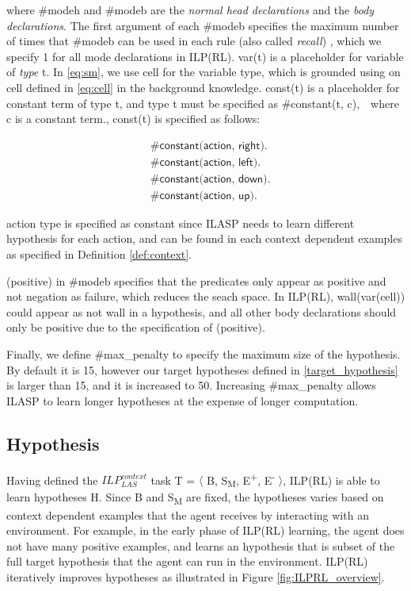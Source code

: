 where \textsf{\#modeh} and \textsf{\#modeb} are the \textit{normal head declarations} and the \textit{body declarations}. 
The first argument of each \textsf{\#modeb} specifies the maximum number of times that \textsf{\#modeb} can be used in each rule (also called \textit{recall}) \cite{Law2017}, 
which we specify 1 for all mode declarations in ILP(RL). \textsf{var(t)} is a placeholder for variable of \textit{type} \textsf{t}. In \ref{eq:sm}, we use \textsf{cell} for the variable type, which is grounded using on \textsf{cell} defined in \ref{eq:cell} in the background knowledge.
\textsf{const(t)} is a placeholder for constant term of type \textsf{t}, and type \textsf{t} must be specified as \textsf{\#constant(t, c)},　where \textsf{c} is a constant term., 
const(t) is specified as follows:

\begin{equation}
\begin{split}
&\textsf{\#constant(action, right).}\\
&\textsf{\#constant(action, left).}\\
&\textsf{\#constant(action, down).}\\
&\textsf{\#constant(action, up).}
\end{split}
\end{equation}

\textsf{action} type is specified as constant since ILASP needs to learn different hypothesis for each action, 
and can be found in each context dependent examples as specified in Definition \ref{def:context}.

\textsf{(positive)} in \textsf{\#modeb} specifies that the predicates only appear as positive and not negation as failure, which reduces the seach space. 
In ILP(RL), \textsf{wall(var(cell))} could appear as \textsf{not wall} in a hypothesis, and all other body declarations should only be positive due to the specification of \textsf{(positive)}. 

Finally, we define \textsf{\#max\_penalty} to specify the maximum size of the hypothesis. By default it is 15, however our target hypotheses defined in \ref{target_hypothesis} is larger than 15, and it is increased to 50.
Increasing \#max\_penalty allows ILASP to learn longer hypotheses at the expense of longer computation.

\subsection{Hypothesis}
\label{sebsec:hypothesis}
Having defined the $ILP_{LAS}^{context}$ task T = $\langle$ B, S\textsubscript{M}, E\textsuperscript{+}, E\textsuperscript{-} $\rangle$, ILP(RL) is able to learn hypotheses H. 
Since B and S\textsubscript{M} are fixed, the hypotheses varies based on context dependent examples that the agent receives by interacting with an environment.
For example, in the early phase of ILP(RL) learning, the agent does not have many positive examples, and learns an hypothesis that is subset of the full target hypothesis that the agent can run in the environment.
ILP(RL) iteratively improves hypotheses as illustrated in Figure \ref{fig:ILPRL_overview}.

